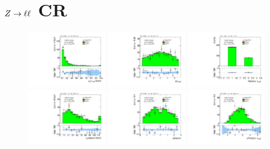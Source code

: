 \clearpage

\section{$Z \rightarrow \ell\ell$ CR}

\begin{figure}[!htpb]
  \centering
  \includegraphics[width=0.30\textwidth]{figures/analysis/vbf-ZllCR/tau-pt}
  \includegraphics[width=0.30\textwidth]{figures/analysis/vbf-ZllCR/tau-eta}
  \includegraphics[width=0.30\textwidth]{figures/analysis/vbf-ZllCR/tau-numTrack} \\
  \includegraphics[width=0.30\textwidth]{figures/analysis/vbf-ZllCR/lep-pt-hi}
  \includegraphics[width=0.30\textwidth]{figures/analysis/vbf-ZllCR/lep-eta}
  \includegraphics[width=0.30\textwidth]{figures/analysis/vbf-ZllCR/taulep-dR} \\

\end{figure}

